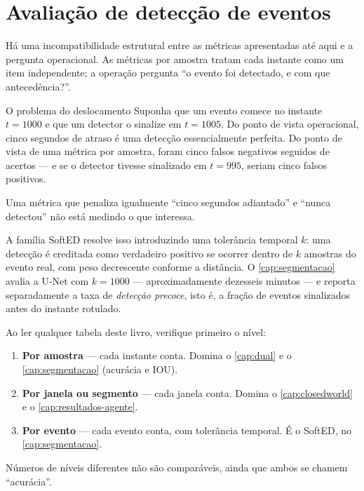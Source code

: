 \section{Avaliação de detecção de eventos}

Há uma incompatibilidade estrutural entre as métricas apresentadas até aqui e a
pergunta operacional. As métricas por amostra tratam cada instante como um item
independente; a operação pergunta ``o evento foi detectado, e com que antecedência?''.

\begin{exemplo}{O problema do deslocamento}
Suponha que um evento comece no instante $t = \num{1000}$ e que um detector o sinalize
em $t = \num{1005}$. Do ponto de vista operacional, cinco segundos de atraso é uma
detecção essencialmente perfeita. Do ponto de vista de uma métrica por amostra, foram
cinco falsos negativos seguidos de acertos --- e se o detector tivesse sinalizado em
$t = \num{995}$, seriam cinco falsos positivos.

Uma métrica que penaliza igualmente ``cinco segundos adiantado'' e ``nunca detectou''
não está medindo o que interessa.
\end{exemplo}

A família SoftED \citep{Salles2024softed} resolve isso introduzindo uma tolerância
temporal $k$: uma detecção é creditada como verdadeiro positivo se ocorrer dentro de
$k$ amostras do evento real, com peso decrescente conforme a distância. O
\cref{cap:segmentacao} avalia a U-Net com $k = \num{1000}$ --- aproximadamente dezesseis
minutos --- e reporta separadamente a taxa de \emph{detecção precoce}, isto é, a fração
de eventos sinalizados antes do instante rotulado.

\begin{destaque}
Ao ler qualquer tabela deste livro, verifique primeiro o nível:
\begin{enumerate}[leftmargin=*,itemsep=0.15em]
  \item \textbf{Por amostra} --- cada instante conta. Domina o \cref{cap:dual} e o
        \cref{cap:segmentacao} (acurácia e IOU).
  \item \textbf{Por janela ou segmento} --- cada janela conta. Domina o
        \cref{cap:closedworld} e o \cref{cap:resultados-agente}.
  \item \textbf{Por evento} --- cada evento conta, com tolerância temporal. É o SoftED,
        no \cref{cap:segmentacao}.
\end{enumerate}
Números de níveis diferentes não são comparáveis, ainda que ambos se chamem
``acurácia''.
\end{destaque}

